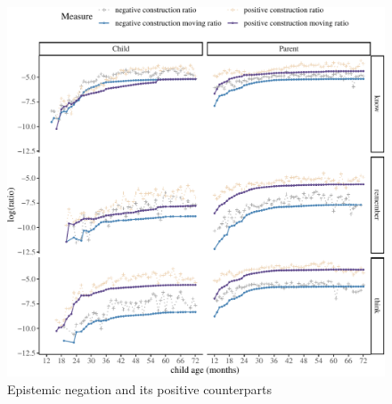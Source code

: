 \documentclass[
  english,
  man,floatsintext]{apa6}
\begin{document}
\begin{figure}[H]

{\centering \includegraphics{neg_construction_article_files/figure-latex/epistemic-1} 

}

\caption{Epistemic negation and its positive counterparts}\label{fig:epistemic}
\end{figure}
\end{document}
